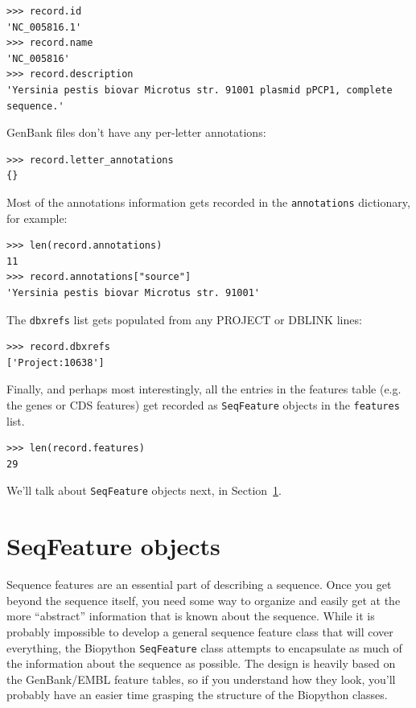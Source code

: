 \documentclass{report}
\begin{document}
\begin{verbatim}
>>> record.id
'NC_005816.1'
>>> record.name
'NC_005816'
>>> record.description
'Yersinia pestis biovar Microtus str. 91001 plasmid pPCP1, complete sequence.'
\end{verbatim}

GenBank files don't have any per-letter annotations:

\begin{verbatim}
>>> record.letter_annotations
{}
\end{verbatim}

Most of the annotations information gets recorded in the \verb|annotations| dictionary, for example:

\begin{verbatim}
>>> len(record.annotations)
11
>>> record.annotations["source"]
'Yersinia pestis biovar Microtus str. 91001'
\end{verbatim}

The \verb|dbxrefs| list gets populated from any PROJECT or DBLINK lines:

\begin{verbatim}
>>> record.dbxrefs
['Project:10638']
\end{verbatim}

Finally, and perhaps most interestingly, all the entries in the features table (e.g. the genes or CDS features) get recorded as \verb|SeqFeature| objects in the \verb|features| list.

\begin{verbatim}
>>> len(record.features)
29
\end{verbatim}

\noindent We'll talk about \verb|SeqFeature| objects next, in
Section~\ref{sec:seq_features}.

\section{SeqFeature objects}
\label{sec:seq_features}

Sequence features are an essential part of describing a sequence. Once you get beyond the sequence itself, you need some way to organize and easily get at the more ``abstract'' information that is known about the sequence. While it is probably impossible to develop a general sequence feature class that will cover everything, the Biopython \verb|SeqFeature| class attempts to encapsulate as much of the information about the sequence as possible. The design is heavily based on the GenBank/EMBL feature tables, so if you understand how they look, you'll probably have an easier time grasping the structure of the Biopython classes.
\end{document}
